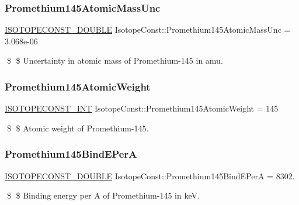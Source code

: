 \subsubsection{\texorpdfstring{Promethium145\+Atomic\+Mass\+Unc}{Promethium145AtomicMassUnc}}
{\footnotesize\ttfamily \mbox{\hyperlink{group___isotope_const-_macros_ga8f45a7272ce02c0b4c65c44636ed719a}{I\+S\+O\+T\+O\+P\+E\+C\+O\+N\+S\+T\+\_\+\+D\+O\+U\+B\+LE}} Isotope\+Const\+::\+Promethium145\+Atomic\+Mass\+Unc = 3.\+068e-\/06}

\$ \$ Uncertainty in atomic mass of Promethium-\/145 in amu. \mbox{\label{group___isotope_const-_promethium-_pm145_gab04605c93155d68004fd6fe077827809}} 
\subsubsection{\texorpdfstring{Promethium145\+Atomic\+Weight}{Promethium145AtomicWeight}}
{\footnotesize\ttfamily \mbox{\hyperlink{group___isotope_const-_macros_ga5f18360b3e99483a35c32d789e62621c}{I\+S\+O\+T\+O\+P\+E\+C\+O\+N\+S\+T\+\_\+\+I\+NT}} Isotope\+Const\+::\+Promethium145\+Atomic\+Weight = 145}

\$ \$ Atomic weight of Promethium-\/145. \mbox{\label{group___isotope_const-_promethium-_pm145_gad0077c56c5d3e702bbec2e17698006ac}} 
\subsubsection{\texorpdfstring{Promethium145\+Bind\+E\+PerA}{Promethium145BindEPerA}}
{\footnotesize\ttfamily \mbox{\hyperlink{group___isotope_const-_macros_ga8f45a7272ce02c0b4c65c44636ed719a}{I\+S\+O\+T\+O\+P\+E\+C\+O\+N\+S\+T\+\_\+\+D\+O\+U\+B\+LE}} Isotope\+Const\+::\+Promethium145\+Bind\+E\+PerA = 8302.}

\$ \$ Binding energy per A of Promethium-\/145 in keV. \mbox{\label{group___isotope_const-_promethium-_pm145_ga0d3b8813a33276d0f4002ee1f0cf0cde}} 
